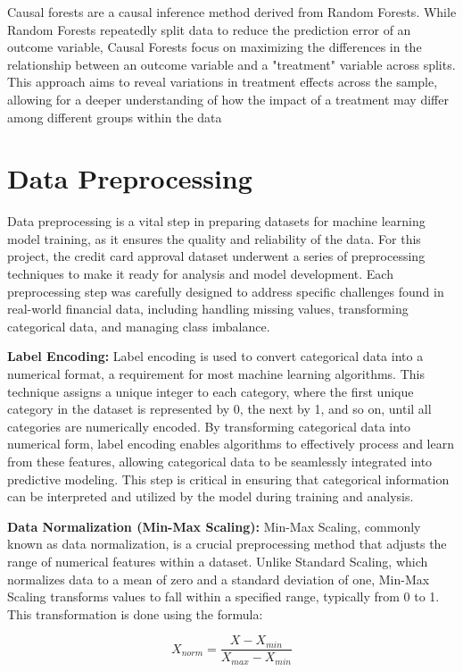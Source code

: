 \documentclass[12pt]{report}
\begin{document}
    Causal forests are a causal inference method derived from Random Forests. While Random Forests repeatedly split data to reduce the prediction error of an outcome variable, Causal Forests focus on maximizing the differences in the relationship between an outcome variable and a "treatment" variable across splits. This approach aims to reveal variations in treatment effects across the sample, allowing for a deeper understanding of how the impact of a treatment may differ among different groups within the data

    \section{Data Preprocessing}

    Data preprocessing is a vital step in preparing datasets for machine learning model training, as it ensures the quality and reliability of the data. For this project, the credit card approval dataset underwent a series of preprocessing techniques to make it ready for analysis and model development. Each preprocessing step was carefully designed to address specific challenges found in real-world financial data, including handling missing values, transforming categorical data, and managing class imbalance.

    {\bfseries Label Encoding:} Label encoding is used to convert categorical data into a numerical format, a requirement for most machine learning algorithms. This technique assigns a unique integer to each category, where the first unique category in the dataset is represented by 0, the next by 1, and so on, until all categories are numerically encoded. By transforming categorical data into numerical form, label encoding enables algorithms to effectively process and learn from these features, allowing categorical data to be seamlessly integrated into predictive modeling. This step is critical in ensuring that categorical information can be interpreted and utilized by the model during training and analysis.

    {\bfseries Data Normalization (Min-Max Scaling):} Min-Max Scaling, commonly known as data normalization, is a crucial preprocessing method that adjusts the range of numerical features within a dataset. Unlike Standard Scaling, which normalizes data to a mean of zero and a standard deviation of one, Min-Max Scaling transforms values to fall within a specified range, typically from 0 to 1. This transformation is done using the formula:

    \[X_{norm} = \frac{X - X_{min}}{X_{max} - X_{min}}\]
\end{document}
